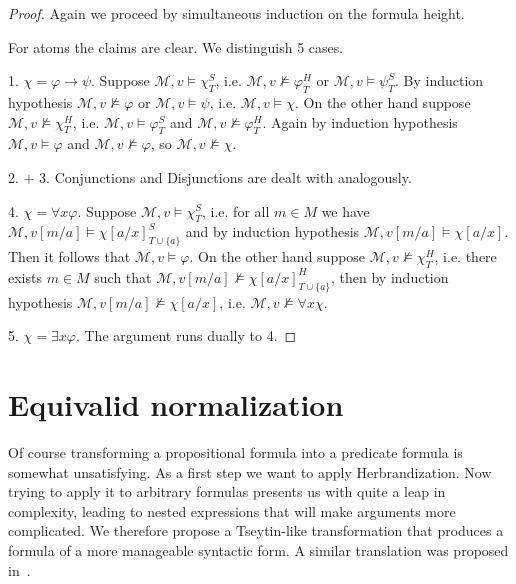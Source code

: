 \documentclass[a4paper,12pt]{report}
\theoremstyle{definition}
\theoremstyle{definition}
\theoremstyle{definition}
\theoremstyle{definition}
\theoremstyle{definition}
\theoremstyle{definition}
\theoremstyle{definition}
\begin{document}
	\begin{proof}
		Again we proceed by simultaneous induction on the formula height.
		
		For atoms the claims are clear. We distinguish 5 cases.
		
		1. $\chi = \varphi\to\psi$. Suppose $\mathcal M, v\models\chi^S_T$, i.e. $\mathcal M, v\not\models\varphi^H_T$ or $\mathcal M, v\models\psi^S_T$. By induction hypothesis $\mathcal M, v\not\models \varphi$ or $\mathcal M, v\models\psi$, i.e. $\mathcal M, v\models \chi$. On the other hand suppose $\mathcal M, v\not\models\chi^H_T$, i.e. $\mathcal M, v\models\varphi^S_T$ and $\mathcal M, v\not\models\varphi^H_T$. Again by induction hypothesis $\mathcal M,v\models\varphi$ and $\mathcal M, v\not\models \varphi$, so $\mathcal M, v\not\models\chi$.
		
		2. + 3. Conjunctions and Disjunctions are dealt with analogously.
		
		4. $\chi = \forall x\varphi$.  Suppose $\mathcal M, v\models\chi^S_T$, i.e. for all $m\in M$ we have $\mathcal M, v[m/a]\models \chi[a/x]^S_{T\cup\{a\}}$ and by induction hypothesis $\mathcal M, v[m/a]\models \chi[a/x]$. Then it follows that $\mathcal M, v\models\varphi$. On the other hand suppose $\mathcal M, v\not\models\chi^H_T$, i.e. there exists $m\in M$ such that $\mathcal M, v[m/a]\not\models\chi[a/x]^H_{T\cup \{a\}}$, then by induction hypothesis $\mathcal M, v[m/a]\not\models \chi[a/x]$, i.e. $\mathcal M, v\not\models\forall x\chi$.
		
		5. $\chi = \exists x\varphi$.  The argument runs dually to 4.
	\end{proof}
	

	
	\section{Equivalid normalization}
	
	Of course transforming a propositional formula into a predicate formula is somewhat unsatisfying. As a first step we want to apply Herbrandization. Now trying to apply it to arbitrary formulas presents us with quite a leap in complexity, leading to nested expressions that will make arguments more complicated. We therefore propose a Tseytin-like transformation that produces a formula of a more manageable syntactic form. A similar translation was proposed in~\cite{statman1979intuitionistic}.
	
\end{document}
